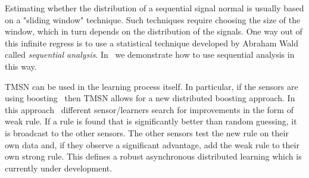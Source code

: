 Estimating whether the distribution of a sequential signal normal is usually based on a "sliding window" technique. Such techniques require choosing the size of the window, which in turn depends on the distribution of the signals.
One way out of this infinite regress is to use a statistical technique developed by Abraham Wald~\cite{wald1973} 
called {\em sequential analysis}. In~\cite{TMSN} we demonstrate how to use sequential analysis in this way.

TMSN can be used in the learning process itself. In particular, if the sensors are using boosting~\cite{boostingbook} then TMSN allows for a new distributed boosting approach. In this approach~\cite{fastboost} different sensor/learners search for 
improvements in the form of weak rule. If a rule is found that is significantly better than random guessing, it is broadcast to the other sensors. The other sensors test the new rule on their own data and, if they observe a significant advantage, add the weak rule to their own strong rule. This defines a robust asynchronous distributed learning which is currently under development.